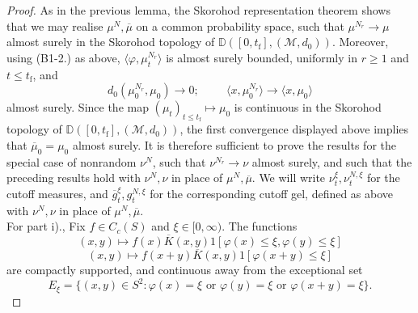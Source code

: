 \begin{proof} As in the previous lemma, the Skorohod representation theorem shows that we may realise $\mu^N, \overline{\mu}$ on a common probability space, such that $\mu^{N_r}\rightarrow \mu$ almost surely in the Skorohod topology of $\mathbb{D}([0,t_\mathrm{f}],(\mathcal{M},d_0))$. Moreover, using (B1-2.) as above, $\langle \varphi, \mu^{N_r}_t\rangle$ is almost surely bounded, uniformly in $r\ge 1$ and $t\le t_\mathrm{f}$, and  \begin{equation}  d_0(\mu^{N_r}_0,\mu_0)\rightarrow 0; \hspace{1cm} \langle x, \mu^{N_r}_0\rangle \rightarrow \langle x, \mu_0\rangle \end{equation} almost surely. Since the map $(\mu_t)_{t\le t_\mathrm{f}}\mapsto \mu_0$ is continuous in the Skorohod topology of $\mathbb{D}([0,t_\mathrm{f}],(\mathcal{M},d_0))$, the first convergence displayed above implies that $\overline{\mu}_0=\mu_0$ almost surely. It is therefore sufficient to prove the results for the special case of nonrandom $\nu^N$, such that  $\nu^{N_r}\rightarrow \nu$ almost surely, and such that the preceding results hold with $\nu^N, \nu$ in place of $\mu^N, \overline{\mu}$. We will write $\nu_t^\xi, \nu^{N,\xi}_t$ for the cutoff measures, and $\overline{g}^\xi_t, g^{N,\xi}_t$ for the corresponding cutoff gel, defined as above with $\nu^N, \nu$ in place of $\mu^N, \overline{\mu}$.  \medskip \\ 
For part i)., Fix $f\in C_c(S)$ and $\xi\in [0, \infty)$. The functions \begin{equation}(x,y) \mapsto f(x)\overline{K}(x,y)1[\varphi(x) \le \xi,\varphi(y) \leq \xi]\end{equation} \begin{equation} (x,y)\mapsto f(x+y)\overline{K}(x,y)1[\varphi(x+y)\le \xi] \end{equation} are compactly supported, and continuous away from the exceptional set \begin{equation} E_\xi=\{(x,y)\in S^2: \varphi(x)=\xi \text{ or } \varphi(y)=\xi \text{ or } \varphi(x+y)=\xi\}. \end{equation} 


\end{proof}
